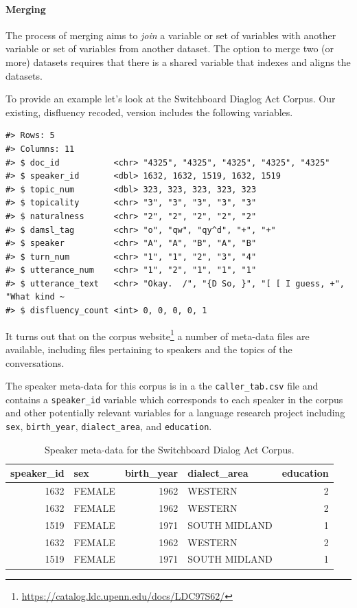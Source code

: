 \documentclass[
]{article}
\DeclareRobustCommand{\href}[2]{#2\footnote{\url{#1}}}
\begin{document}
\hypertarget{merging}{%
\paragraph{Merging}\label{merging}}

The process of merging aims to \emph{join} a variable or set of variables with another variable or set of variables from another dataset. The option to merge two (or more) datasets requires that there is a shared variable that indexes and aligns the datasets.

To provide an example let's look at the Switchboard Diaglog Act Corpus. Our existing, disfluency recoded, version includes the following variables.

\begin{verbatim}
#> Rows: 5
#> Columns: 11
#> $ doc_id           <chr> "4325", "4325", "4325", "4325", "4325"
#> $ speaker_id       <dbl> 1632, 1632, 1519, 1632, 1519
#> $ topic_num        <dbl> 323, 323, 323, 323, 323
#> $ topicality       <chr> "3", "3", "3", "3", "3"
#> $ naturalness      <chr> "2", "2", "2", "2", "2"
#> $ damsl_tag        <chr> "o", "qw", "qy^d", "+", "+"
#> $ speaker          <chr> "A", "A", "B", "A", "B"
#> $ turn_num         <chr> "1", "1", "2", "3", "4"
#> $ utterance_num    <chr> "1", "2", "1", "1", "1"
#> $ utterance_text   <chr> "Okay.  /", "{D So, }", "[ [ I guess, +", "What kind ~
#> $ disfluency_count <int> 0, 0, 0, 0, 1
\end{verbatim}

It turns out that on the \href{https://catalog.ldc.upenn.edu/docs/LDC97S62/}{corpus website} a number of meta-data files are available, including files pertaining to speakers and the topics of the conversations.

The speaker meta-data for this corpus is in a the \texttt{caller\_tab.csv} file and contains a \texttt{speaker\_id} variable which corresponds to each speaker in the corpus and other potentially relevant variables for a language research project including \texttt{sex}, \texttt{birth\_year}, \texttt{dialect\_area}, and \texttt{education}.

\begin{table}

\caption{\label{tab:merging-swda-speaker-table}Speaker meta-data for the Switchboard Dialog Act Corpus.}
\centering
\begin{tabular}[t]{rlrlr}
\toprule
speaker\_id & sex & birth\_year & dialect\_area & education\\
\midrule
1632 & FEMALE & 1962 & WESTERN & 2\\
1632 & FEMALE & 1962 & WESTERN & 2\\
1519 & FEMALE & 1971 & SOUTH MIDLAND & 1\\
1632 & FEMALE & 1962 & WESTERN & 2\\
1519 & FEMALE & 1971 & SOUTH MIDLAND & 1\\
\bottomrule
\end{tabular}
\end{table}
\end{document}
